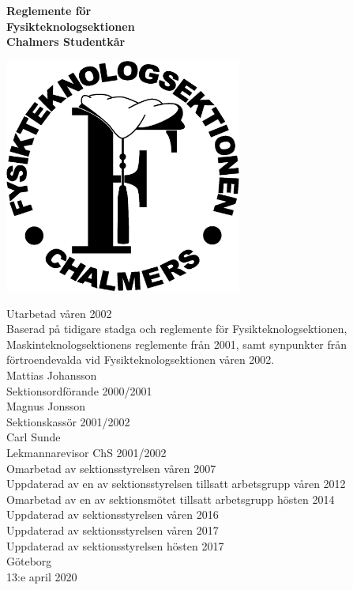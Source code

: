 \documentclass[11pt,a4paper]{article}
\begin{document}
\thispagestyle{empty} %
\begin{center}
  \textbf{\Huge{Reglemente för}}\\[3mm]
  \textbf{\Huge{Fysikteknologsektionen}}\\
  \vspace{.7 cm}
  \textbf{\Large{Chalmers Studentkår}}

  \vspace{1.25em}
  \includegraphics[width=7.8cm]{sektionslogo.eps}
  \vspace{1.25em}
    
    Utarbetad våren 2002\\[5mm]
    Baserad på tidigare stadga och reglemente för Fysikteknologsektionen,
    Maskinteknologsektionens reglemente från 2001, samt synpunkter
    från förtroendevalda vid Fysikteknologsektionen våren 2002.\\[4mm]
    Mattias Johansson\\
    Sektionsordförande 2000/2001\\[4mm]
    Magnus Jonsson\\
    Sektionskassör 2001/2002\\[4mm]
    Carl Sunde\\
    Lekmannarevisor ChS 2001/2002\\[4mm]
    Omarbetad av sektionsstyrelsen våren 2007\\[4mm]
    Uppdaterad av en av sektionsstyrelsen tillsatt arbetsgrupp våren 2012\\[4mm]
    Omarbetad av en av sektionsmötet tillsatt arbetsgrupp hösten 2014 \\[4mm]
    Uppdaterad av sektionsstyrelsen våren 2016 \\
    Uppdaterad av sektionsstyrelsen våren 2017 \\
    Uppdaterad av sektionsstyrelsen hösten 2017 \\
    
    \vspace{.3 cm}
    \small{Göteborg}\\
    \small{13:e april 2020}
    \vspace{2.5em} %
\end{center}
\end{document}
